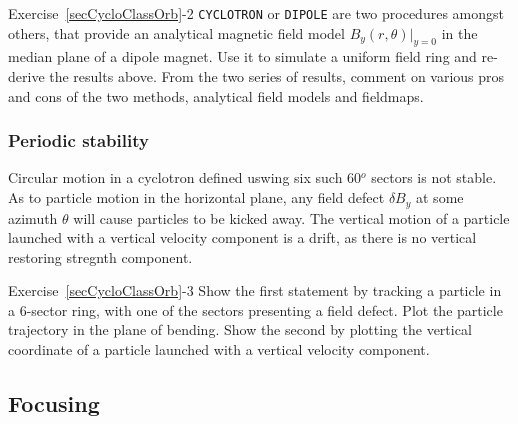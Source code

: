 \smallskip
\noindent {\small $\bullet$} Exercise~\ref{secCycloClassOrb}-2 
 \verb|CYCLOTRON| or \verb|DIPOLE| are two procedures amongst others, that provide an analytical 
 magnetic field model ${B_y(r,\theta)|_{y=0}}$ in the median plane of a dipole magnet. 
Use it to simulate a uniform field ring and re-derive the results above. 
From the two series of results, comment on various pros and cons of the two methods, analytical field models and 
fieldmaps.



\subsubsection*{Periodic stability \label{secCycloFocus}}

Circular motion in a  cyclotron defined uswing six such 60$^o$ sectors is not stable.
As to particle motion in the horizontal plane,  any field defect $\delta B_y$ 
at some azimuth $\theta$ will cause particles to be kicked away. The vertical 
motion of a particle launched with a vertical velocity component is a drift, as there is no 
vertical restoring stregnth component.

\smallskip
\noindent {\small $\bullet$} Exercise~\ref{secCycloClassOrb}-3 
Show the first statement by tracking a particle in a 6-sector ring, with one of the sectors presenting a field defect. 
Plot the particle trajectory in the plane of bending.
Show the second by plotting the vertical coordinate  of a particle launched with a vertical velocity component. 



\subsection{Focusing  \label{secCycloFocus}}

